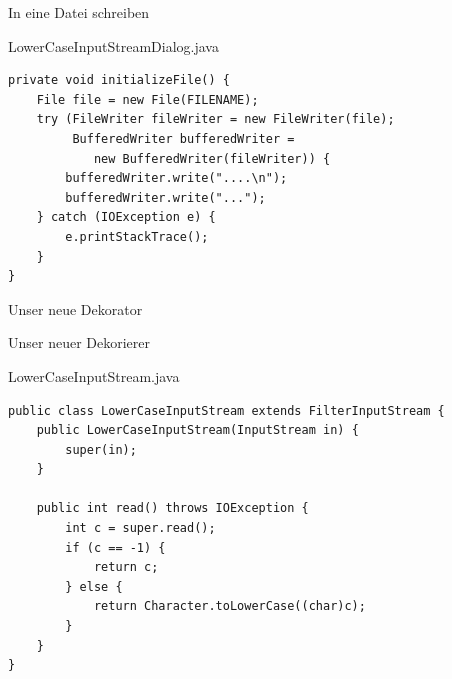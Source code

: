 \begin{frame}[fragile]{In eine Datei schreiben}
	\begin{exampleblock}{LowerCaseInputStreamDialog.java}
		\begin{lstlisting}
private void initializeFile() {
    File file = new File(FILENAME);
    try (FileWriter fileWriter = new FileWriter(file);
         BufferedWriter bufferedWriter = 
            new BufferedWriter(fileWriter)) {
        bufferedWriter.write("....\n");
        bufferedWriter.write("...");
    } catch (IOException e) {
        e.printStackTrace();
    }
}
 		\end{lstlisting}
	 \end{exampleblock}
\end{frame}

\begin{frame}{Unser neue Dekorator}
\end{frame}

\begin{frame}[fragile]{Unser neuer Dekorierer}
	\begin{exampleblock}{LowerCaseInputStream.java}
		\begin{lstlisting}
public class LowerCaseInputStream extends FilterInputStream {
	public LowerCaseInputStream(InputStream in) {
		super(in);
	}
	
	public int read() throws IOException {
		int c = super.read();
		if (c == -1) {
			return c; 
		} else {
			return Character.toLowerCase((char)c);
		}
	}
}
		\end{lstlisting}
	 \end{exampleblock}
\end{frame}


